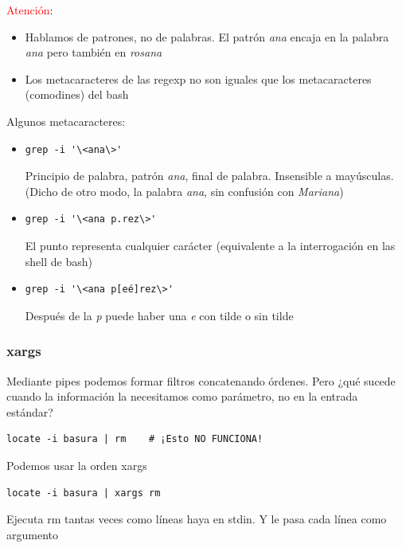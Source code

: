 \documentclass[ucs]{beamer}
\begin{document}
\begin{frame}[fragile]
\textcolor{red}{Atención}: 
\begin{itemize}
\item
Hablamos de patrones, no de palabras.
El patrón \emph{ana} encaja en la palabra
\emph{ana}
pero también en
\emph{rosana}
\item
Los metacaracteres de las regexp no son iguales que los metacaracteres (comodines) del bash
\end{itemize}

Algunos metacaracteres:
\begin{itemize}
\item
\begin{verbatim}
grep -i '\<ana\>'
\end{verbatim}
Principio de palabra, patrón \emph{ana}, final de palabra. Insensible a mayúsculas.
(Dicho de otro modo, la palabra \emph{ana},
sin confusión con \emph{Mariana})
\item
\begin{verbatim}
grep -i '\<ana p.rez\>'
\end{verbatim}

El punto representa cualquier carácter (equivalente a la interrogación en las shell de bash)
\item
\begin{verbatim}
grep -i '\<ana p[eé]rez\>'
\end{verbatim}

Después de la \emph{p} puede haber una \emph{e} con tilde o sin tilde

\end{itemize}


\end{frame}
\begin{frame}[fragile]
\frametitle{xargs}

Mediante pipes podemos formar filtros concatenando órdenes.
Pero ¿qué sucede cuando la información la necesitamos como
parámetro, no en la entrada estándar?

  \begin{footnotesize}
  \begin{verbatim}
locate -i basura | rm    # ¡Esto NO FUNCIONA!
  \end{verbatim}
  \end{footnotesize}

Podemos usar la orden xargs

  \begin{footnotesize}
  \begin{verbatim}
locate -i basura | xargs rm
  \end{verbatim}
  \end{footnotesize}

Ejecuta rm tantas veces como líneas haya en stdin. Y le pasa cada línea
como argumento


\end{frame}
\end{document}
